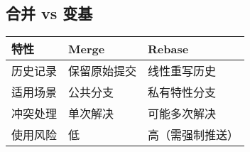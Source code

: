 \subsection{合并 vs 变基}
\begin{center}
\begin{tabular}{@{}lll@{}}
    \toprule
    \textbf{特性} & \textbf{Merge} & \textbf{Rebase} \\
    \midrule
    历史记录 & 保留原始提交 & 线性重写历史 \\
    适用场景 & 公共分支 & 私有特性分支 \\
    冲突处理 & 单次解决 & 可能多次解决 \\
    使用风险 & 低 & 高（需强制推送） \\
    \bottomrule
\end{tabular}
\end{center}


